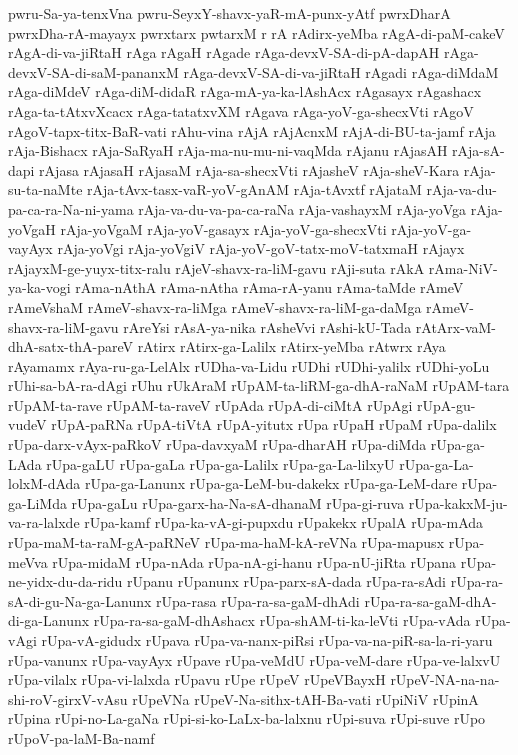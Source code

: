 {pwru-Sa-ya-tenxVna
pwru-SeyxY-shavx-yaR-mA-punx-yAtf
pwrxDharA
pwrxDha-rA-mayayx
pwrxtarx
pwtarxM
r
rA
rAdirx-yeMba
rAgA-di-paM-cakeV
rAgA-di-va-jiRtaH
rAga
rAgaH
rAgade
rAga-devxV-SA-di-pA-dapAH
rAga-devxV-SA-di-saM-pananxM
rAga-devxV-SA-di-va-jiRtaH
rAgadi
rAga-diMdaM
rAga-diMdeV
rAga-diM-didaR
rAga-mA-ya-ka-lAshAcx
rAgasayx
rAgashacx
rAga-ta-tAtxvXcacx
rAga-tatatxvXM
rAgava
rAga-yoV-ga-shecxVti
rAgoV
rAgoV-tapx-titx-BaR-vati
rAhu-vina
rAjA
rAjAcnxM
rAjA-di-BU-ta-jamf
rAja
rAja-Bishacx
rAja-SaRyaH
rAja-ma-nu-mu-ni-vaqMda
rAjanu
rAjasAH
rAja-sA-dapi
rAjasa
rAjasaH
rAjasaM
rAja-sa-shecxVti
rAjasheV
rAja-sheV-Kara
rAja-su-ta-naMte
rAja-tAvx-tasx-vaR-yoV-gAnAM
rAja-tAvxtf
rAjataM
rAja-va-du-pa-ca-ra-Na-ni-yama
rAja-va-du-va-pa-ca-raNa
rAja-vashayxM
rAja-yoVga
rAja-yoVgaH
rAja-yoVgaM
rAja-yoV-gasayx
rAja-yoV-ga-shecxVti
rAja-yoV-ga-vayAyx
rAja-yoVgi
rAja-yoVgiV
rAja-yoV-goV-tatx-moV-tatxmaH
rAjayx
rAjayxM-ge-yuyx-titx-ralu
rAjeV-shavx-ra-liM-gavu
rAji-suta
rAkA
rAma-NiV-ya-ka-vogi
rAma-nAthA
rAma-nAtha
rAma-rA-yanu
rAma-taMde
rAmeV
rAmeVshaM
rAmeV-shavx-ra-liMga
rAmeV-shavx-ra-liM-ga-daMga
rAmeV-shavx-ra-liM-gavu
rAreYsi
rAsA-ya-nika
rAsheVvi
rAshi-kU-Tada
rAtArx-vaM-dhA-satx-thA-pareV
rAtirx
rAtirx-ga-Lalilx
rAtirx-yeMba
rAtwrx
rAya
rAyamamx
rAya-ru-ga-LelAlx
rUDha-va-Lidu
rUDhi
rUDhi-yalilx
rUDhi-yoLu
rUhi-sa-bA-ra-dAgi
rUhu
rUkAraM
rUpAM-ta-liRM-ga-dhA-raNaM
rUpAM-tara
rUpAM-ta-rave
rUpAM-ta-raveV
rUpAda
rUpA-di-ciMtA
rUpAgi
rUpA-gu-vudeV
rUpA-paRNa
rUpA-tiVtA
rUpA-yitutx
rUpa
rUpaH
rUpaM
rUpa-dalilx
rUpa-darx-vAyx-paRkoV
rUpa-davxyaM
rUpa-dharAH
rUpa-diMda
rUpa-ga-LAda
rUpa-gaLU
rUpa-gaLa
rUpa-ga-Lalilx
rUpa-ga-La-lilxyU
rUpa-ga-La-lolxM-dAda
rUpa-ga-Lanunx
rUpa-ga-LeM-bu-dakekx
rUpa-ga-LeM-dare
rUpa-ga-LiMda
rUpa-gaLu
rUpa-garx-ha-Na-sA-dhanaM
rUpa-gi-ruva
rUpa-kakxM-ju-va-ra-lalxde
rUpa-kamf
rUpa-ka-vA-gi-pupxdu
rUpakekx
rUpalA
rUpa-mAda
rUpa-maM-ta-raM-gA-paRNeV
rUpa-ma-haM-kA-reVNa
rUpa-mapusx
rUpa-meVva
rUpa-midaM
rUpa-nAda
rUpa-nA-gi-hanu
rUpa-nU-jiRta
rUpana
rUpa-ne-yidx-du-da-ridu
rUpanu
rUpanunx
rUpa-parx-sA-dada
rUpa-ra-sAdi
rUpa-ra-sA-di-gu-Na-ga-Lanunx
rUpa-rasa
rUpa-ra-sa-gaM-dhAdi
rUpa-ra-sa-gaM-dhA-di-ga-Lanunx
rUpa-ra-sa-gaM-dhAshacx
rUpa-shAM-ti-ka-leVti
rUpa-vAda
rUpa-vAgi
rUpa-vA-gidudx
rUpava
rUpa-va-nanx-piRsi
rUpa-va-na-piR-sa-la-ri-yaru
rUpa-vanunx
rUpa-vayAyx
rUpave
rUpa-veMdU
rUpa-veM-dare
rUpa-ve-lalxvU
rUpa-vilalx
rUpa-vi-lalxda
rUpavu
rUpe
rUpeV
rUpeVBayxH
rUpeV-NA-na-na-shi-roV-girxV-vAsu
rUpeVNa
rUpeV-Na-sithx-tAH-Ba-vati
rUpiNiV
rUpinA
rUpina
rUpi-no-La-gaNa
rUpi-si-ko-LaLx-ba-lalxnu
rUpi-suva
rUpi-suve
rUpo
rUpoV-pa-laM-Ba-namf
}
